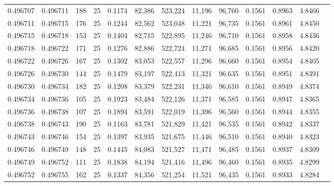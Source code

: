 \begin{tabular}{rrrrrrrrrrrrr}
0.496707 & 0.496711 & 188 &  25 &                                     0.1174 &  82,386 & 523,224 &  11,196 &  96,760 & 0.1561 & 0.8963 & 4.8466 \\
0.496711 & 0.496715 & 176 &  25 &                                     0.1244 &  82,562 & 523,048 &  11,221 &  96,735 & 0.1561 & 0.8961 & 4.8450 \\
0.496715 & 0.496718 & 153 &  25 &                                     0.1404 &  82,715 & 522,895 &  11,246 &  96,710 & 0.1561 & 0.8958 & 4.8436 \\
0.496718 & 0.496722 & 171 &  25 &                                     0.1276 &  82,886 & 522,724 &  11,271 &  96,685 & 0.1561 & 0.8956 & 4.8420 \\
0.496722 & 0.496726 & 167 &  25 &                                     0.1302 &  83,053 & 522,557 &  11,296 &  96,660 & 0.1561 & 0.8954 & 4.8405 \\
0.496726 & 0.496730 & 144 &  25 &                                     0.1479 &  83,197 & 522,413 &  11,321 &  96,635 & 0.1561 & 0.8951 & 4.8391 \\
0.496730 & 0.496734 & 182 &  25 &                                     0.1208 &  83,379 & 522,231 &  11,346 &  96,610 & 0.1561 & 0.8949 & 4.8374 \\
0.496734 & 0.496736 & 105 &  25 &                                     0.1923 &  83,484 & 522,126 &  11,371 &  96,585 & 0.1561 & 0.8947 & 4.8365 \\
0.496736 & 0.496738 & 107 &  25 &                                     0.1894 &  83,591 & 522,019 &  11,396 &  96,560 & 0.1561 & 0.8944 & 4.8355 \\
0.496738 & 0.496743 & 190 &  25 &                                     0.1163 &  83,781 & 521,829 &  11,421 &  96,535 & 0.1561 & 0.8942 & 4.8337 \\
0.496743 & 0.496746 & 154 &  25 &                                     0.1397 &  83,935 & 521,675 &  11,446 &  96,510 & 0.1561 & 0.8940 & 4.8323 \\
0.496746 & 0.496749 & 148 &  25 &                                     0.1445 &  84,083 & 521,527 &  11,471 &  96,485 & 0.1561 & 0.8937 & 4.8309 \\
0.496749 & 0.496752 & 111 &  25 &                                     0.1838 &  84,194 & 521,416 &  11,496 &  96,460 & 0.1561 & 0.8935 & 4.8299 \\
0.496752 & 0.496755 & 162 &  25 &                                     0.1337 &  84,356 & 521,254 &  11,521 &  96,435 & 0.1561 & 0.8933 & 4.8284 \\

\end{tabular}
